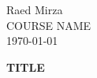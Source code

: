 \documentclass[12pt, fleqn]{amsart}
\begin{document}
\begin{flushleft}
Raed Mirza \\[0.5em]
COURSE NAME \\[0.5em]
\today \\[2em]
\end{flushleft}

\begin{center}
{\LARGE \textbf{TITLE}}
\end{center}
\end{document}
